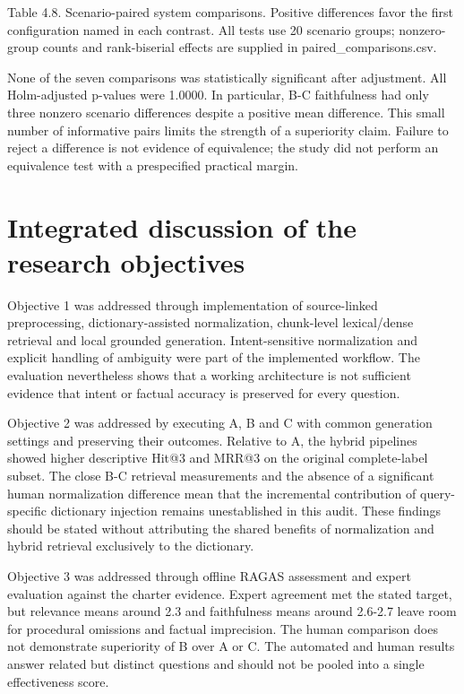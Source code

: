 Table 4.8. Scenario-paired system comparisons. Positive differences favor the first configuration named in each contrast. All tests use 20 scenario groups; nonzero-group counts and rank-biserial effects are supplied in paired\_comparisons.csv.


None of the seven comparisons was statistically significant after adjustment. All Holm-adjusted p-values were 1.0000. In particular, B-C faithfulness had only three nonzero scenario differences despite a positive mean difference. This small number of informative pairs limits the strength of a superiority claim. Failure to reject a difference is not evidence of equivalence; the study did not perform an equivalence test with a prespecified practical margin.


\section{Integrated discussion of the research objectives}

Objective 1 was addressed through implementation of source-linked preprocessing, dictionary-assisted normalization, chunk-level lexical/dense retrieval and local grounded generation. Intent-sensitive normalization and explicit handling of ambiguity were part of the implemented workflow. The evaluation nevertheless shows that a working architecture is not sufficient evidence that intent or factual accuracy is preserved for every question.


Objective 2 was addressed by executing A, B and C with common generation settings and preserving their outcomes. Relative to A, the hybrid pipelines showed higher descriptive Hit@3 and MRR@3 on the original complete-label subset. The close B-C retrieval measurements and the absence of a significant human normalization difference mean that the incremental contribution of query-specific dictionary injection remains unestablished in this audit. These findings should be stated without attributing the shared benefits of normalization and hybrid retrieval exclusively to the dictionary.


Objective 3 was addressed through offline RAGAS assessment and expert evaluation against the charter evidence. Expert agreement met the stated target, but relevance means around 2.3 and faithfulness means around 2.6-2.7 leave room for procedural omissions and factual imprecision. The human comparison does not demonstrate superiority of B over A or C. The automated and human results answer related but distinct questions and should not be pooled into a single effectiveness score.


